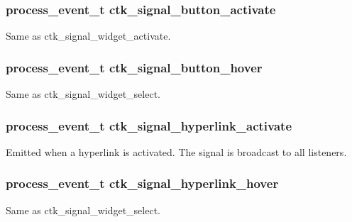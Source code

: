 \subsubsection[{ctk\+\_\+signal\+\_\+button\+\_\+activate}]{\setlength{\rightskip}{0pt plus 5cm}process\+\_\+event\+\_\+t ctk\+\_\+signal\+\_\+button\+\_\+activate}\label{group__ctkevents_ga73b4f7cc9f9fd72c23ea9b24b3492e01}
Same as ctk\+\_\+signal\+\_\+widget\+\_\+activate. \hypertarget{group__ctkevents_ga18b0bcdb7d4ba13f8f692ffd8d54a690}{}
\subsubsection[{ctk\+\_\+signal\+\_\+button\+\_\+hover}]{\setlength{\rightskip}{0pt plus 5cm}process\+\_\+event\+\_\+t ctk\+\_\+signal\+\_\+button\+\_\+hover}\label{group__ctkevents_ga18b0bcdb7d4ba13f8f692ffd8d54a690}
Same as ctk\+\_\+signal\+\_\+widget\+\_\+select. \hypertarget{group__ctkevents_gab927db233b2469345094ba7b9e1c769a}{}
\subsubsection[{ctk\+\_\+signal\+\_\+hyperlink\+\_\+activate}]{\setlength{\rightskip}{0pt plus 5cm}process\+\_\+event\+\_\+t ctk\+\_\+signal\+\_\+hyperlink\+\_\+activate}\label{group__ctkevents_gab927db233b2469345094ba7b9e1c769a}
Emitted when a hyperlink is activated. The signal is broadcast to all listeners. \hypertarget{group__ctkevents_ga9e08a17ead01c3ae4ac4e96b40cae885}{}
\subsubsection[{ctk\+\_\+signal\+\_\+hyperlink\+\_\+hover}]{\setlength{\rightskip}{0pt plus 5cm}process\+\_\+event\+\_\+t ctk\+\_\+signal\+\_\+hyperlink\+\_\+hover}\label{group__ctkevents_ga9e08a17ead01c3ae4ac4e96b40cae885}
Same as ctk\+\_\+signal\+\_\+widget\+\_\+select. \hypertarget{group__ctkevents_ga516fdcf33758900be278d0e448635b9d}{}
